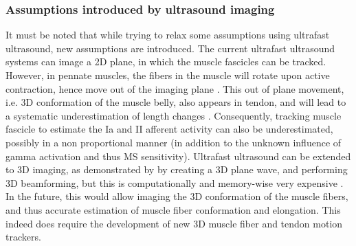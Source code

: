 \subsubsection{Assumptions introduced by ultrasound imaging}
It must be noted that while trying to relax some assumptions using ultrafast ultrasound, new assumptions are introduced. The current ultrafast ultrasound systems can image a 2D plane, in which the muscle fascicles can be tracked. However, in pennate muscles, the fibers in the muscle will rotate upon active contraction, hence move out of the imaging plane \cite{finni_structural_2006}. This out of plane movement, i.e. 3D conformation of the muscle belly, also appears in tendon, and will lead to a systematic underestimation of length changes \cite{seynnes_ultrasound-based_2014}. Consequently, tracking muscle fascicle to estimate the Ia and II afferent activity can also be underestimated, possibly in a non proportional manner (in addition to the unknown influence of gamma activation and thus MS sensitivity). Ultrafast ultrasound can be extended to 3D imaging, as demonstrated by \citeauthor{provost_3d_2014} by creating a 3D plane wave, and performing 3D beamforming, but this is computationally and memory-wise very expensive \cite{provost_3d_2014}. In the future, this would allow imaging the 3D conformation of the muscle fibers, and thus accurate estimation of muscle fiber conformation and elongation. This indeed does require the development of new 3D muscle fiber and tendon motion trackers. 




